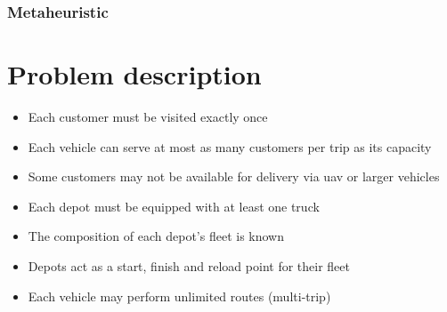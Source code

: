\documentclass[twocolumn]{article}
\begin{document}
	\subsubsection{Metaheuristic}
	
	
	\section{Problem description}
	\begin{itemize}
		\item Each customer must be visited exactly once
		\item Each vehicle can serve at most as many customers per trip as its capacity
		\item Some customers may not be available for delivery via uav or larger vehicles
		\item Each depot must be equipped with at least one truck
		\item The composition of each depot's fleet is known
		\item Depots act as a start, finish and reload point for their fleet
		\item Each vehicle may perform unlimited routes (multi-trip)
	\end{itemize}
\end{document}
